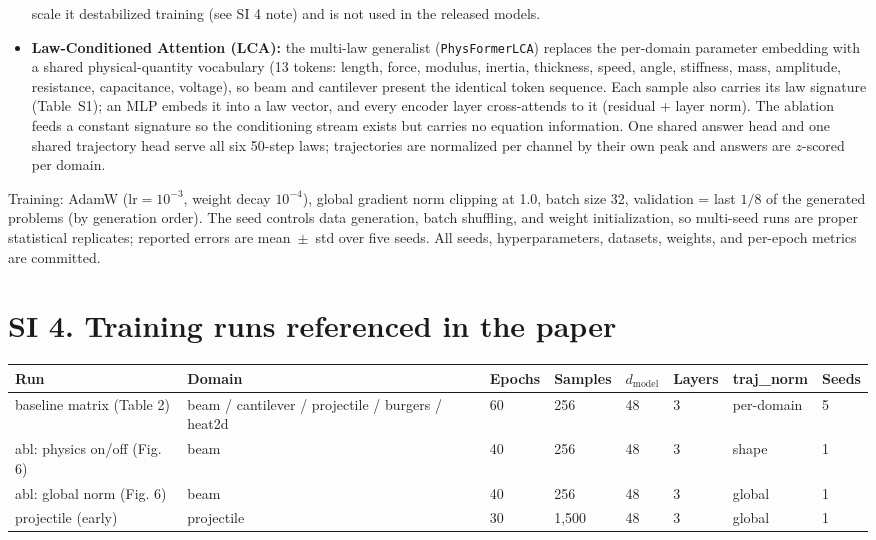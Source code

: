 \documentclass[11pt,a4paper]{article}
\begin{document}
\begin{itemize}[leftmargin=1.6em,itemsep=1pt]
      scale it destabilized training (see SI 4 note) and is not used in
      the released models.
\item \textbf{Law-Conditioned Attention (LCA):} the multi-law generalist
      (\texttt{PhysFormerLCA}) replaces the per-domain parameter embedding
      with a shared physical-quantity vocabulary (13 tokens: length, force,
      modulus, inertia, thickness, speed, angle, stiffness, mass, amplitude,
      resistance, capacitance, voltage), so beam and cantilever present the
      identical token sequence. Each sample also carries its law signature
      (Table~S1); an MLP embeds it into a law vector, and every encoder
      layer cross-attends to it (residual + layer norm). The ablation
      feeds a constant signature so the conditioning stream exists but
      carries no equation information. One shared answer head and one
      shared trajectory head serve all six 50-step laws; trajectories are
      normalized per channel by their own peak and answers are $z$-scored
      per domain.
\end{itemize}

Training: AdamW ($\mathrm{lr}=10^{-3}$, weight decay $10^{-4}$), global
gradient norm clipping at 1.0, batch size 32, validation = last $1/8$ of
the generated problems (by generation order). The seed controls data
generation, batch shuffling, and weight initialization, so multi-seed runs
are proper statistical replicates; reported errors are mean~$\pm$~std over
five seeds. All seeds, hyperparameters, datasets, weights, and per-epoch
metrics are committed.

\section*{SI 4. Training runs referenced in the paper}

\begin{center}
\small
\begin{tabular}{llllllll}
\toprule
Run & Domain & Epochs & Samples & $d_{\text{model}}$ & Layers & traj\_norm & Seeds \\
\midrule
baseline matrix (Table 2) & beam / cantilever / projectile / burgers / heat2d & 60 & 256 & 48 & 3 & per-domain & 5 \\
abl: physics on/off (Fig. 6) & beam & 40 & 256 & 48 & 3 & shape & 1 \\
abl: global norm (Fig. 6) & beam & 40 & 256 & 48 & 3 & global & 1 \\
projectile (early) & projectile & 30 & 1{,}500 & 48 & 3 & global & 1 \\
\bottomrule
\end{tabular}
\end{center}
\end{document}
